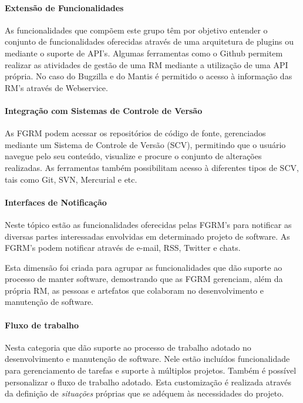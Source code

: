 \paragraph{Extensão de Funcionalidades}
\label{par:extensão_de_funcionalidades}

As funcionalidades que compõem este grupo têm por objetivo entender o conjunto
de funcionalidades oferecidas através de uma arquitetura de plugins ou mediante
o suporte de API's. Algumas ferramentas como o Github permitem realizar as
atividades de gestão de uma RM mediante a utilização de uma API própria. No caso
do Bugzilla e do Mantis é permitido o acesso à informação das RM's através de
Webservice.

\paragraph{Integração com Sistemas de Controle de Versão}
\label{par:integração_com_sistemas_de_controle_de_versão}

As FGRM podem acessar os repositórios de código de fonte, gerenciados mediante
um Sistema de Controle de Versão (SCV), permitindo que o usuário navegue pelo
seu conteúdo, visualize e procure o conjunto de alterações realizadas. As
ferramentas também possibilitam acesso à diferentes tipos de SCV, tais como Git,
SVN, Mercurial e etc.

\paragraph{Interfaces de Notificação}
\label{par:interfaces_de_notificação}

Neste tópico estão as funcionalidades oferecidas pelas FGRM's para notificar as
diversas partes interessadas envolvidas em determinado projeto de software. As
FGRM's podem notificar através de e-mail, RSS, Twitter e chats.

Esta dimensão foi criada para agrupar as funcionalidades que dão suporte ao
processo de manter software, demostrando que as FGRM gerenciam, além da própria
RM, as pessoas e artefatos que colaboram no desenvolvimento e manutenção de
software.

\paragraph{Fluxo de trabalho}
\label{par:fluxo_de_trabalho}

Nesta categoria que dão suporte ao processo de trabalho adotado no
desenvolvimento e manutenção de software. Nele estão incluídos funcionalidade
para gerenciamento de tarefas e suporte à múltiplos projetos. Também é possível
personalizar o fluxo de trabalho adotado. Esta customização é realizada através
da definição de \textit{situações} próprias que se adéquem às necessidades do
projeto.

